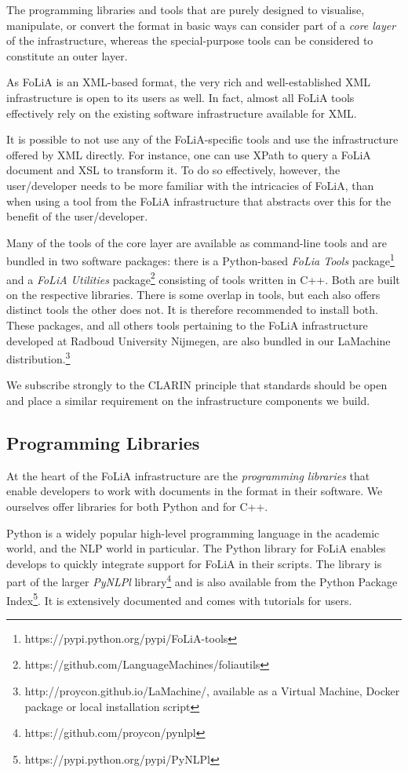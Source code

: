 \documentclass[a4paper,11pt]{article}
\begin{document}
The programming libraries and tools that are purely designed to visualise,
manipulate, or convert the format in basic ways can consider part of a
\emph{core layer} of the infrastructure, whereas the special-purpose tools can
be considered to constitute an outer layer.

As FoLiA is an XML-based format, the very rich and well-established XML
infrastructure is open to its users as well. In fact, almost all FoLiA tools
effectively rely on the existing software infrastructure available for XML. 

It is possible to not use any of the FoLiA-specific tools and use the
infrastructure offered by XML directly. For instance, one can use XPath to
query a FoLiA document and XSL to transform it. To do so effectively, however,
the user/developer needs to be more familiar with the intricacies of FoLiA,
than when using a tool from the FoLiA infrastructure that abstracts over this
for the benefit of the user/developer.

Many of the tools of the core layer are available as command-line tools and are
bundled in two software packages: there is a Python-based \emph{FoLia Tools}
package\footnote{https://pypi.python.org/pypi/FoLiA-tools} and a \emph{FoLiA
Utilities} package\footnote{https://github.com/LanguageMachines/foliautils}
consisting of tools written in C++. Both are built on the respective libraries.
There is some overlap in tools, but each also offers distinct tools the other
does not. It is therefore recommended to install both. These packages, and all
others tools pertaining to the FoLiA infrastructure developed at Radboud
University Nijmegen, are also bundled in our LaMachine
distribution.\footnote{http://proycon.github.io/LaMachine/, available as a
Virtual Machine, Docker package or local installation script}

We subscribe strongly to the CLARIN principle that standards should be open and
place a similar requirement on the infrastructure components we build. 

\subsection{Programming Libraries}

At the heart of the FoLiA infrastructure are the \emph{programming libraries} that
enable developers to work with documents in the format in their software. We
ourselves offer libraries for both Python and for C++.

Python is a widely popular high-level programming language in the academic
world, and the NLP world in particular.  The Python library for FoLiA enables
develops to quickly integrate support for FoLiA in their scripts. The library
is part of the larger \emph{PyNLPl}
library\footnote{https://github.com/proycon/pynlpl} and is also available from the
Python Package Index\footnote{https://pypi.python.org/pypi/PyNLPl}. It is extensively documented and comes with tutorials for
users.
\end{document}
